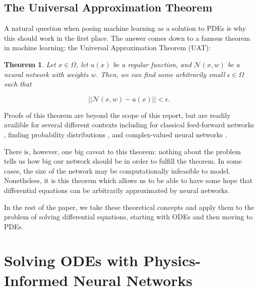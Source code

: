 \documentclass{CUP-JNL-DTM}%
\newtheorem{theorem}{Theorem}[section]
\theoremstyle{definition}
\numberwithin{equation}{section}
\newcommand{\net}{\mathcal{N}}
\begin{document}

\subsection{The Universal Approximation Theorem}

A natural question when posing machine learning as a solution to PDEs is why this should work in the first place. The answer comes down to a famous theorem in machine learning: the Universal Approximation Theorem (UAT):

\begin{theorem}

Let $x \in \Omega$, let $u(x)$ be a regular function, and $\net(x,w)$ be a neural network with weights $w$. Then, we can find some arbitrarily small $\epsilon \in \Omega$ such that 

\begin{equation}
	||\net(x,w) - u(x)|| < \epsilon. 
\end{equation}

\end{theorem}

\noindent Proofs of this theorem are beyond the scope of this report, but are readily availible for several different contexts including for classical feed-forward networks \cite{hornikMultilayerFeedforwardNetworks1989, hornikApproximationCapabilitiesMultilayer1991}, finding probability distributions \cite{luUniversalApproximationTheorem2020}, and complex-valued neural networks \cite{voigtlaenderUniversalApproximationTheorem2020}. 

There is, however, one big caveat to this theorem: nothing about the problem tells us how big our network should be in order to fulfill the theorem. In some cases, the size of the network may be computationally infeasible to model. Nonetheless, it is this theorem which allows us to be able to have some hope that differential equations can be arbitrarily approximated by neural networks. 

In the rest of the paper, we take these theoretical concepts and apply them to the problem of solving differential equations, starting with ODEs and then moving to PDEs. 


\section{Solving ODEs with Physics-Informed Neural Networks}
\end{document}
